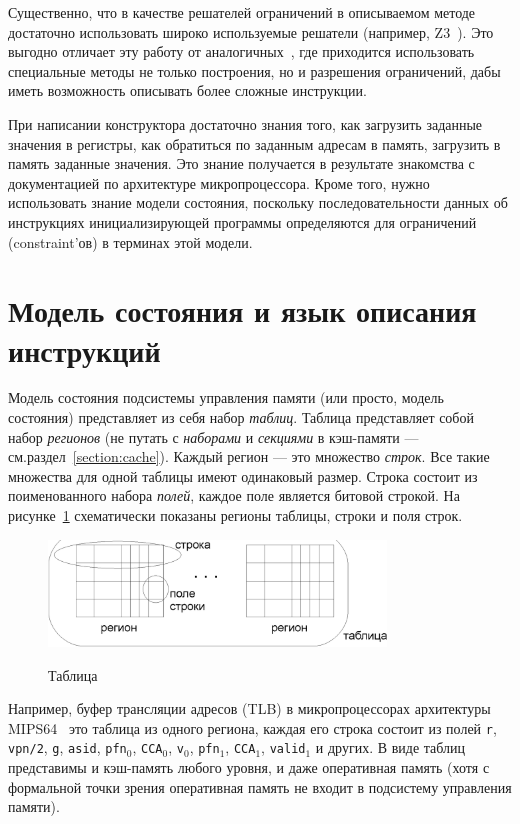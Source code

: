 Существенно, что в качестве решателей ограничений в описываемом методе достаточно использовать широко используемые решатели (например, Z3~\cite{Z3}). Это выгодно отличает эту работу от аналогичных~\cite{GenesysPro}, где приходится использовать специальные методы не только построения, но и разрешения
ограничений, дабы иметь возможность описывать более сложные инструкции.

При написании конструктора достаточно знания того, как загрузить заданные
значения в регистры, как обратиться по заданным адресам в память, загрузить в память заданные значения. Это знание получается в результате знакомства с
документацией по архитектуре микропроцессора. Кроме того, нужно использовать знание модели состояния, поскольку последовательности данных об инструкциях инициализирующей программы определяются для ограничений (constraint'ов) в терминах этой модели.

\section{Модель состояния и язык описания инструкций}\label{sec:state_model_section}

Модель состояния подсистемы управления памяти (или просто, модель состояния)
представляет из себя набор \emph{таблиц}. Таблица представляет собой набор
\emph{регионов} (не путать с \emph{наборами} и \emph{секциями} в кэш-памяти --- см.раздел~\ref{section:cache}). Каждый регион --- это множество \emph{строк}. Все такие
множества для одной таблицы имеют одинаковый размер. Строка состоит из
поименованного набора \emph{полей}, каждое поле является битовой строкой. На
рисунке~\ref{table_picture} схематически показаны регионы таблицы, строки и поля
строк.

\begin{figure}[h] \center
  \includegraphics[width=0.8\textwidth]{2.theor/table.eps}\\
  \caption{Таблица}\label{table_picture}
\end{figure}

Например, буфер трансляции адресов (TLB) в микропроцессорах архитектуры
MIPS64~\cite{mips64III} это таблица из одного региона, каждая его строка
состоит из полей \texttt{r}, \texttt{vpn/2}, \texttt{g}, \texttt{asid},
\texttt{pfn}$_0$, \texttt{CCA}$_0$, \texttt{v}$_0$, \texttt{pfn}$_1$,
\texttt{CCA}$_1$, \texttt{valid}$_1$ и других. В виде таблиц представимы и
кэш-память любого уровня, и даже оперативная память (хотя с формальной точки зрения оперативная
память не входит в подсистему управления памяти).

